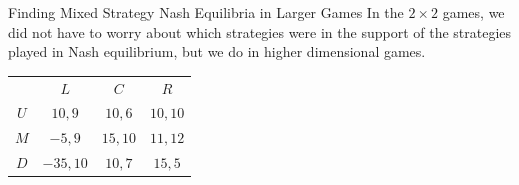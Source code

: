 \documentclass[8pt]{extarticle}
\begin{document}
  \begin{problem}{Finding Mixed Strategy Nash Equilibria in Larger Games}
    In the $2\times 2$ games, we did not have to worry about which strategies were in the support of the strategies played in Nash equilibrium, but we do in higher dimensional games.
    \begin{center}
      \renewcommand{\arraystretch}{1.5}
      \begin{tabular}{c|c|c|c|}
        \multicolumn{1}{c}{} & \multicolumn{1}{c}{$L$} & \multicolumn{1}{c}{$C$} & \multicolumn{1}{c}{$R$}\\
        \cline{2-4}
        $U$ & $10,9$ & $10,6$ & $10,10$ \\
        \cline{2-4}
        $M$ & $-5,9$ & $15,10$ & $11,12$\\
        \cline{2-4}
        $D$ & $-35,10$ & $10,7$ & $15,5$\\
        \cline{2-4}
      \end{tabular}
    \end{center}
  \end{problem}
\end{document}
